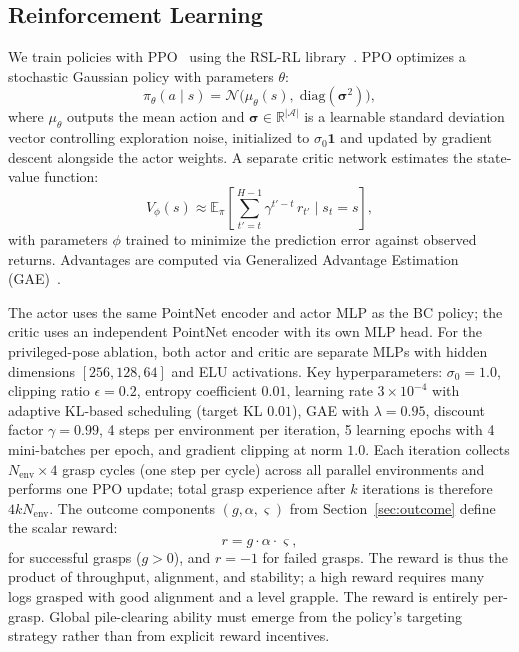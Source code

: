 \documentclass[conference]{IEEEtran}
\begin{document}
\subsection{Reinforcement Learning}
\label{sec:rl}
We train policies with PPO~\cite{schulman2017ppo} using the RSL-RL library~\cite{rudin2022learning}.
PPO optimizes a stochastic Gaussian policy with parameters $\theta$:
\begin{equation}
    \pi_\theta(a \mid s) = \mathcal{N}\!\big(\mu_\theta(s),\;\mathrm{diag}(\bm{\sigma}^2)\big),
\end{equation}
where $\mu_\theta$ outputs the mean action and $\bm{\sigma} \in \mathbb{R}^{|\mathcal{A}|}$ is a learnable standard deviation vector controlling exploration noise, initialized to $\sigma_0 \mathbf{1}$ and updated by gradient descent alongside the actor weights.
A separate critic network estimates the state-value function:
\begin{equation}
    V_\phi(s) \approx \mathbb{E}_\pi\!\left[\sum_{t'=t}^{H-1} \gamma^{t'-t}\, r_{t'} \;\Big|\; s_t = s\right],
\end{equation}
with parameters $\phi$ trained to minimize the prediction error against observed returns.
Advantages are computed via Generalized Advantage Estimation (GAE)~\cite{schulman2017ppo}.

The actor uses the same PointNet encoder and actor MLP as the BC policy; the critic uses an independent PointNet encoder with its own MLP head.
For the privileged-pose ablation, both actor and critic are separate MLPs with hidden dimensions $[256, 128, 64]$ and ELU activations.
Key hyperparameters: $\sigma_0 = 1.0$, clipping ratio $\epsilon=0.2$, entropy coefficient $0.01$, learning rate $3\times10^{-4}$ with adaptive KL-based scheduling (target KL $0.01$), GAE with $\lambda=0.95$, discount factor $\gamma = 0.99$, 4 steps per environment per iteration, 5 learning epochs with 4 mini-batches per epoch, and gradient clipping at norm $1.0$.
Each iteration collects $N_{\text{env}} \times 4$ grasp cycles (one step per cycle) across all parallel environments and performs one PPO update; total grasp experience after $k$ iterations is therefore $4 k N_{\text{env}}$.
The outcome components $(g,\alpha,\varsigma)$ from Section~\ref{sec:outcome} define the scalar reward:
\label{eq:reward}
\begin{equation}
r = g \cdot \alpha \cdot \varsigma,
\end{equation}
for successful grasps ($g > 0$), and $r = -1$ for failed grasps.
The reward is thus the product of throughput, alignment, and stability; a high reward requires many logs grasped with good alignment and a level grapple.
The reward is entirely per-grasp.
Global pile-clearing ability must emerge from the policy's targeting strategy rather than from explicit reward incentives.
\end{document}
